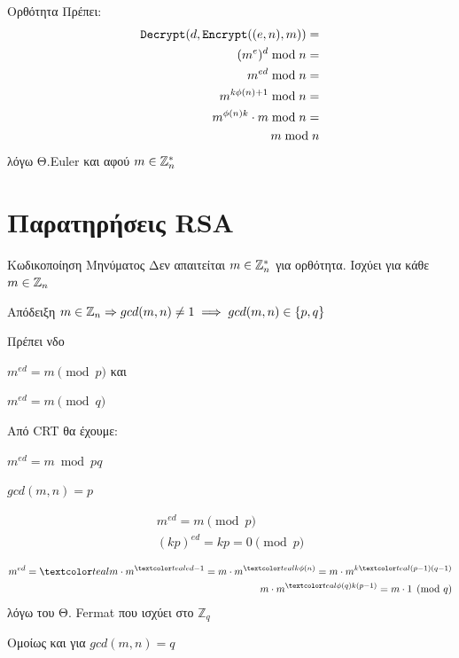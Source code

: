 \documentclass[handout]{beamer}
\begin{document}
\begin{frame}{Ορθότητα}
Πρέπει: 
\pause
\begin{align*} 
\mathtt{Decrypt}(d, \mathtt{Encrypt}((e,n), m)) = \\  
(m^e)^d \bmod n = \\
 m^{ed} \bmod n = \\
m^{k\phi(n)+1} \bmod n = \\ 
m^{\phi(n)k}  \cdot m  \bmod n = \\ 
m \bmod n
\end{align*}
λόγω Θ.Euler και αφού $m \in \mathbb{Z}^*_n$
\end{frame}

\section{Παρατηρήσεις RSA}
\begin{frame}[allowframebreaks]{Κωδικοποίηση Μηνύματος}
Δεν απαιτείται $m \in \mathbb{Z}^*_n$ για ορθότητα. Ισχύει για κάθε $m \in \mathbb{Z}_n$

\framebreak

\begin{block}{Απόδειξη}
$m \in \mathbb{Z}_n \Rightarrow gcd(m,n) \neq 1 \implies gcd(m,n) \in \{ p,q \}  $

Πρέπει νδο 

$m^{ed} = m \pmod{p}$ και 

$m^{ed} = m \pmod{q}$ 

Από CRT θα έχουμε: 

$m^{ed} = m \bmod{pq}$
\end{block}

\framebreak

\begin{block}{$gcd(m,n)=p$}
\begin{small}
\begin{align*}
m^{ed} = m \pmod{p} \\
(kp)^{ed} = kp = 0 \pmod{p}
\end{align*}  

\begin{align*}
m^{ed} = \green{m} \cdot m^{\green{ed-1}} = m \cdot m^{\green{k\phi(n)}}=  m \cdot m^{k\green{(p-1)(q-1)}} \\
m \cdot m^{\green{{\phi(q)}}k(p-1)} = m \cdot 1 \pmod{q}
\end{align*}
λόγω του Θ. Fermat που ισχύει στο $\mathbb{Z}_q$ 
\end{small}
\end{block}
Ομοίως και για $gcd(m,n)=q$

\end{frame}
\end{document}
